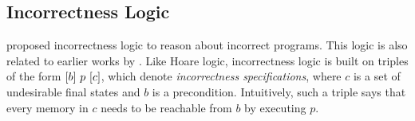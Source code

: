 \subsection{Incorrectness Logic}
%
\citet{OHearn_2020} proposed incorrectness logic to reason about
incorrect programs.  This logic is also related to earlier works by
\citet{devries_ReverseHoareLogic_2011}.  Like Hoare logic, incorrectness logic is built on
triples of the form \([b]~p~[c]\), which denote \emph{incorrectness
  specifications}, where \(c\) is a set of undesirable final states and \(b\) is a
precondition. Intuitively, such a triple says that every memory in \(c\) needs
to be reachable from \(b\) by executing \(p\).

